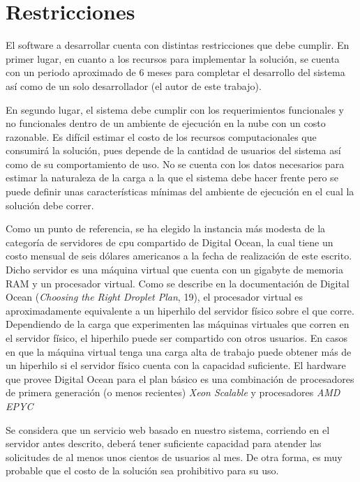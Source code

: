 \section{Restricciones}

El software a desarrollar cuenta con distintas restricciones que debe cumplir.
En primer lugar, en cuanto a los recursos para implementar la solución, se
cuenta con un periodo aproximado de 6 meses para completar el desarrollo del
sistema así como de un solo desarrollador (el autor de este trabajo).

En segundo lugar, el sistema debe cumplir con los requerimientos funcionales y
no funcionales dentro de un ambiente de ejecución en la nube con un costo
razonable. Es difícil estimar el costo de los recursos computacionales que
consumirá la solución, pues depende de la cantidad de usuarios del sistema así
como de su comportamiento de uso. No se cuenta con los datos necesarios para
estimar la naturaleza de la carga a la que el sistema debe hacer frente pero se
puede definir unas características mínimas del ambiente de ejecución en el cual
la solución debe correr.

Como un punto de referencia, se ha elegido la instancia más modesta de la
categoría de servidores de cpu compartido de Digital Ocean, la cual tiene un
costo mensual de seis dólares americanos a la fecha de realización de este
escrito. Dicho servidor es una máquina virtual que cuenta con un gigabyte de
memoria RAM y un procesador virtual. Como se describe en la documentación de
Digital Ocean (\textit{Choosing the Right Droplet Plan}, 19), el procesador
virtual es aproximadamente equivalente a un hiperhilo del servidor físico sobre
el que corre. Dependiendo de la carga que experimenten las máquinas virtuales
que corren en el servidor físico, el hiperhilo puede ser compartido con otros
usuarios. En casos en que la máquina virtual tenga una carga alta de trabajo
puede obtener más de un hiperhilo si el servidor físico cuenta con la capacidad
suficiente. El hardware que provee Digital Ocean para el plan básico es una
combinación de procesadores de primera generación (o menos recientes)
\textit{Xeon Scalable} y procesadores \textit{AMD EPYC}

Se considera que un servicio web basado en nuestro sistema, corriendo en el
servidor antes descrito, deberá tener suficiente capacidad para atender las
solicitudes de al menos unos cientos de usuarios al mes. De otra forma, es muy
probable que el costo de la solución sea prohibitivo para su uso.


